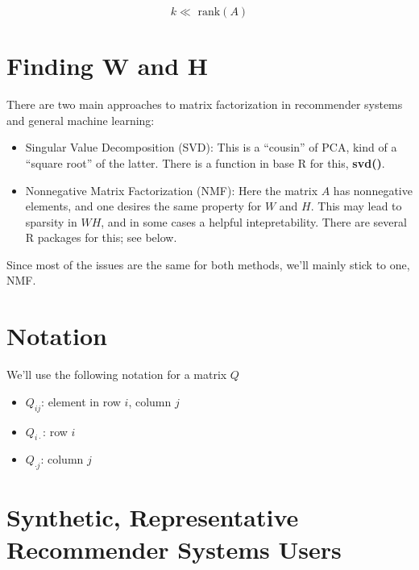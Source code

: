 \begin{equation}
k \ll \textrm{ rank}(A)
\end{equation}

\section{Finding W and H}

There are two main approaches to matrix factorization in recommender
systems and general machine learning:

\begin{itemize}

\item Singular Value Decomposition (SVD):  This is a ``cousin'' of PCA,
kind of a ``square root'' of the latter.  There is a function in base R
for this, \textbf{svd()}.

\item Nonnegative Matrix Factorization (NMF): Here the matrix $A$ has
nonnegative elements, and one desires the same property for $W$ and $H$.
This may lead to sparsity in $WH$, and in some cases a helpful
intepretability.  There are several R packages for this; see below.

\end{itemize} 

Since most of the issues are the same for both methods, we'll mainly stick
to one, NMF.

\section{Notation}

We'll use the following notation for a matrix $Q$

\begin{itemize}

\item $Q_{ij}$:  element in row $i$, column $j$

\item $Q_{i \cdot}$:  row $i$

\item $Q_{\cdot j}$:  column $j$

\end{itemize}

\section{Synthetic, Representative Recommender Systems Users}
\label{synth}

